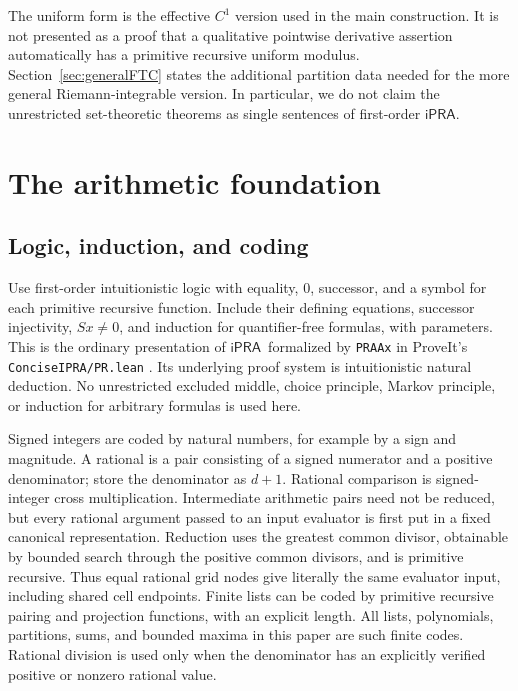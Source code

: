 \documentclass[11pt]{article}
\theoremstyle{definition}
\newcommand{\ipra}{\ensuremath{\mathsf{iPRA}}}
\newcommand{\code}[1]{\texttt{#1}}
\begin{document}
The uniform form is the effective \(C^1\) version used in the main
construction.  It is not presented as a proof that a qualitative
pointwise derivative assertion automatically has a primitive recursive
uniform modulus.  Section~\ref{sec:generalFTC} states the additional
partition data needed for the more general Riemann-integrable version.
In particular, we do not claim the unrestricted set-theoretic theorems
as single sentences of first-order \ipra.

\section{The arithmetic foundation}\label{sec:foundation}

\subsection{Logic, induction, and coding}

Use first-order intuitionistic logic with equality, \(0\), successor,
and a symbol for each primitive recursive function.  Include their
defining equations, successor injectivity, \(Sx\ne0\), and induction for
quantifier-free formulas, with parameters.  This is the ordinary
presentation of \ipra\ formalized by \code{PRAAx} in ProveIt's
\code{ConciseIPRA/PR.lean} \cite{prsource}.  Its underlying proof system
is intuitionistic natural deduction.  No unrestricted excluded middle,
choice principle, Markov principle, or induction for arbitrary formulas
is used here.

Signed integers are coded by natural numbers, for example by a sign and
magnitude.  A rational is a pair consisting of a signed numerator and a
positive denominator; store the denominator as \(d+1\).  Rational
comparison is signed-integer cross multiplication.  Intermediate
arithmetic pairs need not be reduced, but every rational argument passed
to an input evaluator is first put in a fixed canonical representation.
Reduction uses the greatest common divisor, obtainable by bounded search
through the positive common divisors, and is primitive recursive.
Thus equal rational grid nodes give literally the same evaluator input,
including shared cell endpoints.  Finite lists can be coded by primitive
recursive pairing and projection functions, with an explicit length.
All lists, polynomials, partitions, sums, and bounded maxima in this
paper are such finite codes.  Rational division is used only when the
denominator has an explicitly verified positive or nonzero rational
value.
\end{document}
